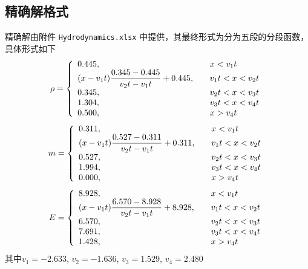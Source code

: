 \documentclass[10.5pt
]{article}
\begin{document}
\subsection{精确解格式}
精确解由附件 \verb|Hydrodynamics.xlsx| 中提供，其最终形式为分为五段的分段函数，具体形式如下
\begin{align}
\rho = \left\{ \begin{array}{ll}
0.445, & \quad x < v_1 t \\
\qty(x-v_1 t)\dfrac{0.345 - 0.445}{v_2 t - v_1 t} + 0.445, & \quad v_1 t < x < v_2 t \\
0.345, & \quad v_2 t< x < v_3 t \\
1.304, & \quad v_3 t< x < v_4 t \\
0.500, & \quad x > v_4 t
\end{array} \right.
\end{align}
\begin{align}
m = \left\{ \begin{array}{ll}
0.311, & \quad x < v_1 t \\
\qty(x-v_1 t)\dfrac{0.527 - 0.311}{v_2 t - v_1 t} + 0.311, & \quad v_1 t < x < v_2 t \\
0.527, & \quad v_2 t< x < v_3 t \\
1.994, & \quad v_3 t< x < v_4 t \\
0.000, & \quad x > v_4 t
\end{array} \right.
\end{align}
\begin{align}
E = \left\{ \begin{array}{ll}
8.928, & \quad x < v_1 t \\
\qty(x-v_1 t)\dfrac{6.570 - 8.928}{v_2 t - v_1 t} + 8.928, & \quad v_1 t < x < v_2 t \\
6.570, & \quad v_2 t< x < v_3 t \\
7.691, & \quad v_3 t< x < v_4 t \\
1.428, & \quad x > v_4 t
\end{array} \right.
\end{align}
其中$v_1 = -2.633$, $v_2 = -1.636$, $v_3 = 1.529$, $v_4 = 2.480$
\end{document}
